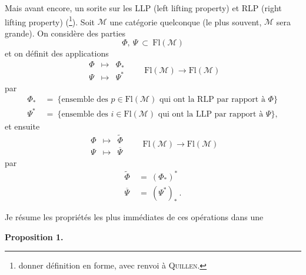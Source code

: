 \documentclass[11pt]{article}
\newcommand{\msp}[1]{\marginpar{\footnotesize [#1]}}
\newcommand{\Fl}{\mathrm{Fl}}
\newcommand{\M}{\mathcal{M}}
\begin{document}
Mais avant encore, un sorite sur les LLP (left lifting property) et RLP (right lifting property) (\footnote[1]{donner définition en forme, avec renvoi à \textsc{Quillen}.}). Soit $\M$ une catégorie quelconque (le plus souvent, $\M$ sera grande). On considère des parties
\[
\Phi,\ \Psi\ \subset\ \Fl(\M)
\]
et on définit des applications
\[
\boxed{\begin{array}{ccc}
\Phi & \longmapsto & \Phi_* \\[1ex]
\Psi & \longmapsto & \Psi^*
\end{array}}
\qquad
\Fl(\M) \longrightarrow \Fl(\M)
\]
 par %
\[
\begin{aligned}
\Phi_* \ &= \ \{\text{ensemble des } p \in \Fl(\M) \text{ qui ont la RLP par rapport à } \Phi\} \\
\Psi^* \ &= \ \{\text{ensemble des } i \in \Fl(\M) \text{ qui ont la LLP par rapport à } \Psi\},
\end{aligned}
\]
et ensuite
\[
\boxed{\begin{array}{ccc}
\Phi & \longmapsto & \widetilde{\Phi} \\[1ex]
\Psi & \longmapsto & \overline{\Psi}
\end{array}}
\qquad
\Fl(\M) \longrightarrow \Fl(\M)
\]
 par %
\[
\begin{aligned}
\widetilde{\Phi} \ &= \ (\Phi_*)^* \\
\overline{\Psi} \ &= \ (\Psi^*)_* \ .
\end{aligned}
\]

\msp{page 2}

Je résume les propriétés les plus immédiates de ces opérations dans une

\noindent\textbf{Proposition 1.}
\end{document}
